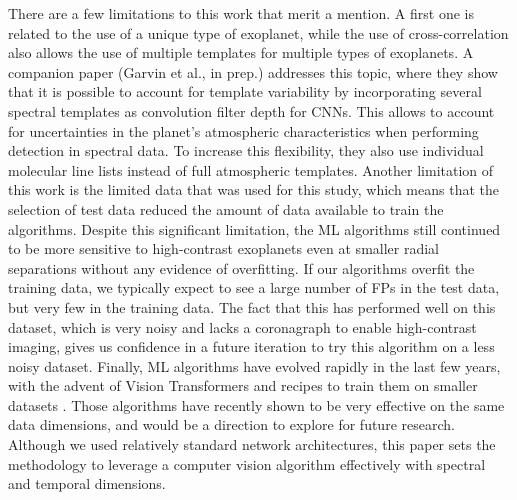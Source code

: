 \documentclass[referee]{aa} %
\begin{document}
There are a few limitations to this work that merit a mention.
A first one is related to the use of a unique type of exoplanet, while the use of cross-correlation also allows the use of multiple templates for multiple types of exoplanets.
A companion paper (Garvin et al., in prep.) addresses this topic, where they show that it is possible to account for template variability by incorporating several spectral templates as convolution filter depth for CNNs. 
This allows to account for uncertainties in the planet's atmospheric characteristics when performing detection in spectral data.
To increase this flexibility, they also use individual molecular line lists instead of full atmospheric templates.
Another limitation of this work is the limited data that was used for this study, which means that the selection of test data reduced the amount of data available to train the algorithms.
Despite this significant limitation, the ML algorithms still continued to be more sensitive to high-contrast exoplanets even at smaller radial separations without any evidence of overfitting.
If our algorithms overfit the training data, we typically expect to see a large number of FPs in the test data, but very few in the training data. 
The fact that this has performed well on this dataset, which is very noisy and lacks a coronagraph to enable high-contrast imaging, gives us confidence in a future iteration to try this algorithm on a less noisy dataset.
Finally, ML algorithms have evolved rapidly in the last few years, with the advent of Vision Transformers \citep{2020ViT} and recipes to train them on smaller datasets \citep[e.g.,][]{2022Gani}. Those algorithms have recently shown to be very effective on the same data dimensions, and would be a direction to explore for future research. Although we used relatively standard network architectures, this paper sets the methodology to leverage a computer vision algorithm effectively with spectral and temporal dimensions.
\end{document}
